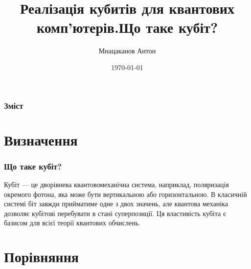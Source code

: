 \documentclass{beamer}
\title{Реалізація кубитів для квантових комп'ютерів.}
\author{Мнацаканов Антон}
\institute[КПІ] %
{
  Національний технічний університет України\\
  "Київський політехнічний інститут імені Ігоря Сікорського"
}
\date{\today}
\begin{document}
\frame{\titlepage}


\begin{frame}
\frametitle{Зміст}
\tableofcontents
\end{frame}


\section{Визначення}

{\title{Що таке кубіт?}
\begin{frame}
\frametitle{Що таке кубіт?}
 Кубіт — це дворівнева квантовомеханічна система, наприклад, поляризація окремого фотона, яка може бути вертикальною або горизонтальною. В класичній системі біт завжди прийматиме одне з двох значень, але квантова механіка дозволяє кубітові перебувати в стані суперпозиції. Ця властивість кубіта є базисом для всієї теорії квантових обчислень.
\end{frame}
}
\section{Порівняння}
\end{document}
